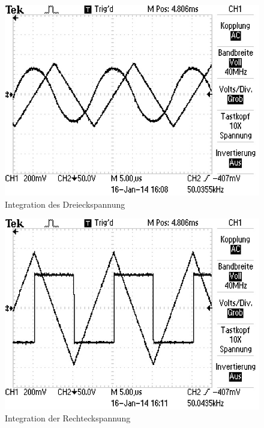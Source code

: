 	\begin{figure}[!h]
		\centering
		\includegraphics[scale=0.7]{Grafiken/Integrator_Dreieck.jpg}
		\caption{Integration des Dreieckspannung}
		\label{fig:Auswertung_Integrator_Dreieck}
	\end{figure}
	
	\begin{figure}[!h]
		\centering
		\includegraphics[scale=0.7]{Grafiken/Integrator_Rechteck.jpg}
		\caption{Integration der Rechteckspannung}
		\label{fig:Auswertung_Integrator_Rechteck}
	\end{figure}